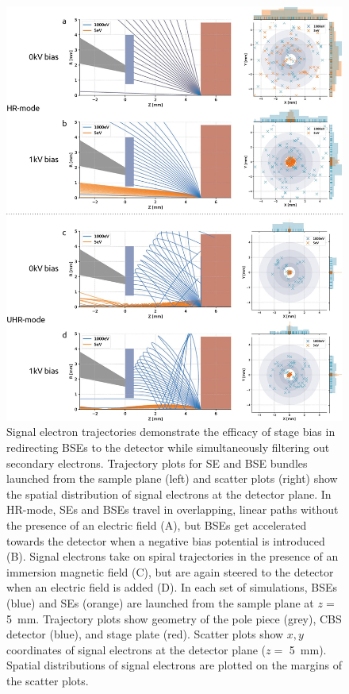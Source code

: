 \begin{figure}[!tb]
    \centering
    \includegraphics[width=0.85\linewidth]{chapter-2/figures_JPEG_HQ/fig2-2_simulations.jpg}
    \caption{Signal electron trajectories demonstrate the efficacy of stage bias in redirecting BSEs to the detector while simultaneously filtering out secondary electrons. Trajectory plots for SE and BSE bundles launched from the sample plane (left) and scatter plots (right) show the spatial distribution of signal electrons at the detector plane. In HR-mode, SEs and BSEs travel in overlapping, linear paths without the presence of an electric field (A), but BSEs get accelerated towards the detector when a negative bias potential is introduced (B). Signal electrons take on spiral trajectories in the presence of an immersion magnetic field (C), but are again steered to the detector when an electric field is added (D). In each set of simulations, BSEs (blue) and SEs (orange) are launched from the sample plane at $z =$ \SI{5}{\milli\meter}. Trajectory plots show geometry of the pole piece (grey), CBS detector (blue), and stage plate (red). Scatter plots show $x, y$ coordinates of signal electrons at the detector plane ($z =$ \SI{5}{\milli\meter}). Spatial distributions of signal electrons are plotted on the margins of the scatter plots.}
    \label{fig:2.2_simulations}
\end{figure}

